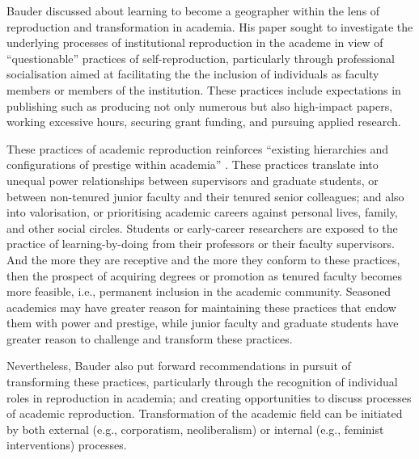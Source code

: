 \documentclass[a4paper, 10.5pt]{article} %
\begin{document}
Bauder discussed about learning to become a geographer within the lens of reproduction and transformation in academia. His paper sought to investigate the underlying processes of institutional reproduction in the academe in view of \enquote{questionable} practices of self-reproduction, particularly through professional socialisation aimed at facilitating the the inclusion of individuals as faculty members or members of the institution. These practices include expectations in publishing such as producing not only numerous but also high-impact papers, working excessive hours, securing grant funding, and pursuing applied research.

These practices of academic reproduction reinforces \enquote{existing hierarchies and configurations of prestige within academia} \cite{bauder_2006}. These practices translate into unequal power relationships between supervisors and graduate students, or between non-tenured junior faculty and their tenured senior colleagues; and also into valorisation, or prioritising academic careers against personal lives, family, and other social circles. Students or early-career researchers are exposed to the practice of learning-by-doing from their professors or their faculty supervisors. And the more they are receptive and the more they conform to these practices, then the prospect of acquiring degrees or promotion as tenured faculty becomes more feasible, i.e., permanent inclusion in the academic community. Seasoned academics may have greater reason for maintaining these practices that endow them with power and prestige, while junior faculty and graduate students have greater reason to challenge and transform these practices.

Nevertheless, Bauder also put forward recommendations in pursuit of transforming these practices, particularly through the recognition of individual roles in reproduction in academia; and creating opportunities to discuss processes of academic reproduction. Transformation of the academic field can be initiated by both external (e.g., corporatism, neoliberalism) or internal (e.g., feminist interventions) processes.
\end{document}
